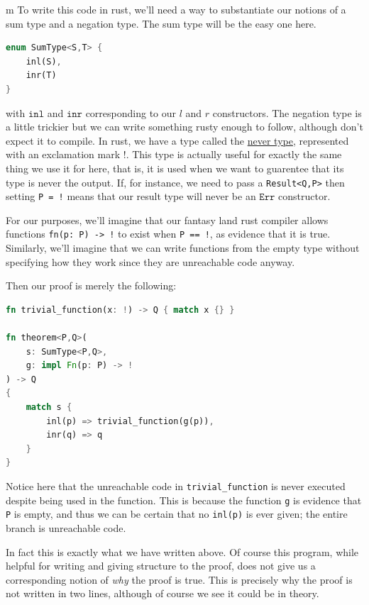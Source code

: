 \documentclass[11pt]{article}
\begin{document}
\begin{my proof}{m}
To write this code in rust, we'll need a way to substantiate our notions of a sum type and a negation type. The sum type will be the easy one here.
\begin{lstlisting}[language=Rust]
enum SumType<S,T> {
	inl(S),
	inr(T)
}
\end{lstlisting}
with $\mathtt{inl}$ and $\mathtt{inr}$ corresponding to our $l$ and $r$ constructors. The negation type is a little trickier but we can write something rusty enough to follow, although don't expect it to compile. In rust, we have a type called the \href{https://doc.rust-lang.org/std/primitive.never.html}{never type}, represented with an exclamation mark $\mathtt{!}$. This type is actually useful for exactly the same thing we use it for here, that is, it is used when we want to guarentee that its type is never the output. If, for instance, we need to pass a \texttt{Result<Q,P>} then setting \texttt{P = !} means that our result type will never be an $\mathtt{Err}$ constructor.

For our purposes, we'll imagine that our fantasy land rust compiler allows functions \texttt{fn(p: P) -> !} to exist when \texttt{P == !}, as evidence that it is true. Similarly, we'll imagine that we can write functions from the empty type without specifying how they work since they are unreachable code anyway.

Then our proof is merely the following:
\begin{lstlisting}[language=Rust]
fn trivial_function(x: !) -> Q { match x {} }

fn theorem<P,Q>(
	s: SumType<P,Q>,
	g: impl Fn(p: P) -> !
) -> Q
{
	match s {
		inl(p) => trivial_function(g(p)),
		inr(q) => q
	}
}
\end{lstlisting}
Notice here that the unreachable code in \texttt{trivial\_function} is never executed despite being used in the function. This is because the function \texttt{g} is evidence that \texttt{P} is empty, and thus we can be certain that no \texttt{inl(p)} is ever given; the entire branch is unreachable code.

In fact this is exactly what we have written above. Of course this program, while helpful for writing and giving structure to the proof, does not give us a corresponding notion of \emph{why} the proof is true. This is precisely why the proof is not written in two lines, although of course we see it could be in theory.
\end{my proof}
\end{document}
